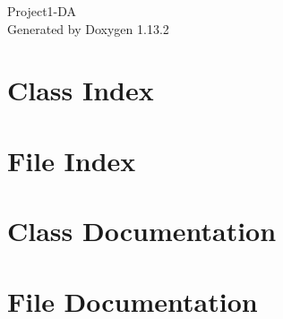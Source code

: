 \documentclass[twoside]{book}
\newcommand{\+}{\discretionary{\mbox{\scriptsize$\hookleftarrow$}}{}{}}
\newcommand{\clearemptydoublepage}{%
    \newpage{\pagestyle{empty}\cleardoublepage}%
  }
\begin{document}
  \raggedbottom
    \hypersetup{pageanchor=false,
                bookmarksnumbered=true,
                pdfencoding=unicode
               }
  \begin{titlepage}
  \vspace*{7cm}
  \begin{center}%
  {\Large Project1-\/\+DA}\\
  \vspace*{1cm}
  {\large Generated by Doxygen 1.13.2}\\
  \end{center}
  \end{titlepage}
  \clearemptydoublepage
  \tableofcontents
  \clearemptydoublepage
  \hypersetup{pageanchor=true}
\chapter{Class Index}

\chapter{File Index}

\chapter{Class Documentation}



\chapter{File Documentation}




  \backmatter
  \newpage
  \clearemptydoublepage
  \printindex
\end{document}

